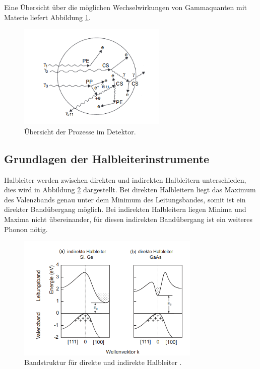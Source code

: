 

Eine Übersicht über die möglichen Wechselwirkungen von Gammaquanten mit Materie liefert
Abbildung \ref{fig:Effekt}.
\begin{figure}[H]
  \centering
  \includegraphics[height=5cm]{Effekte.png}
  \caption{Übersicht der Prozesse im Detektor. \cite{Gilmore2}}
  \label{fig:Effekt}
\end{figure}


\subsection{Grundlagen der Halbleiterinstrumente}
Halbleiter werden zwischen direkten und indirekten Halbleitern unterschieden, dies wird
in Abbildung \ref{fig:Band} dargestellt. Bei direkten Halbleitern
liegt das Maximum des Valenzbands genau unter dem Minimum des Leitungsbandes, somit ist ein direkter Bandübergang möglich.
Bei indirekten Halbleitern liegen Minima und Maxima nicht übereinander, für diesen indirekten Bandübergang ist
ein weiteres Phonon nötig.\\

\begin{figure}
  \centering
  \includegraphics[height=6cm]{Band.png}
  \caption{Bandstruktur für direkte und indirekte Halbleiter \cite{Springer3}.}
  \label{fig:Band}
\end{figure}

